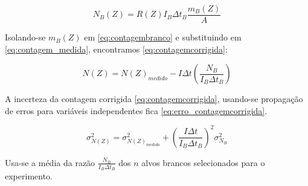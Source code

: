 \begin{equation}
  \label{eq:contagembranco}
  N_B(Z) = R(Z) I_B\Delta t_B \frac{m_B(Z)}{A}
\end{equation}

Isolando-se $m_B(Z)$ em \ref{eq:contagembranco} e substituindo em 
\ref{eq:contagem_medida}, encontramos \ref{eq:contagemcorrigida}:
 
\begin{equation}
  \label{eq:contagemcorrigida}
  N(Z) = N(Z)_{medido} - I\Delta t \left( \frac{N_B}{I_B \Delta t_B} \right)
\end{equation}


A incerteza da contagem corrigida \ref{eq:contagemcorrigida}, 
usando-se propagação de erros para variáveis independentes fica
\ref{eq:erro_contagemcorrigida}.

\begin{equation}
  \label{eq:erro_contagemcorrigida}
  \sigma_{N(Z)}^2 = \sigma_{N(Z)_{medido}}^2 + \left( \frac{I \Delta t}{I_B \Delta t_B} \right)^2 \sigma_{N_B}^2
\end{equation}

Usa-se a média da razão $\frac{N_B}{I_B \Delta t_B}$ dos $n$ alvos brancos
selecionados para o experimento. 






